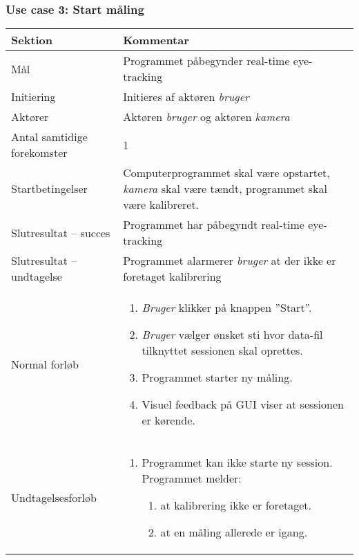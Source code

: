 \documentclass[kravspec.tex]{subfiles}
\begin{document}
	\subsubsection{Use case 3: Start måling}
	\begin{tabular}{|l|p{7.7cm}|}
		\hline \textbf{Sektion} 	& \textbf{Kommentar} \\ 
		\hline Mål  & Programmet påbegynder real-time eye-tracking \\ 
		\hline Initiering  & Initieres af aktøren \textit{bruger} \\ 
		\hline Aktører & Aktøren \textit{bruger} og aktøren \textit{kamera} \\ 
		\hline Antal samtidige forekomster & 1 \\ 
		\hline Startbetingelser & Computerprogrammet skal være opstartet, \textit{kamera} skal være tændt, programmet skal være kalibreret. \\ 
		\hline Slutresultat – succes & Programmet har påbegyndt real-time eye-tracking\\ 
		\hline Slutresultat – undtagelse & Programmet alarmerer \textit{bruger} at der ikke er foretaget kalibrering \\ 
		\hline Normal forløb & \begin{enumerate}
			\item \textit{Bruger} klikker på knappen ”Start”.
			\item \textit{Bruger} vælger ønsket sti hvor data-fil tilknyttet sessionen skal oprettes. 
			\item Programmet starter ny måling.
			\item Visuel feedback på GUI viser at sessionen er kørende.
		\end{enumerate} \\  
		\hline Undtagelsesforløb & \begin{enumerate}
			\item Programmet kan ikke starte ny session. Programmet melder:
			\begin{enumerate}
				\item at kalibrering ikke er foretaget.
				\item at en måling allerede er igang. 
			\end{enumerate}
		\end{enumerate} \\ 
		\hline 
	\end{tabular}
\end{document}
